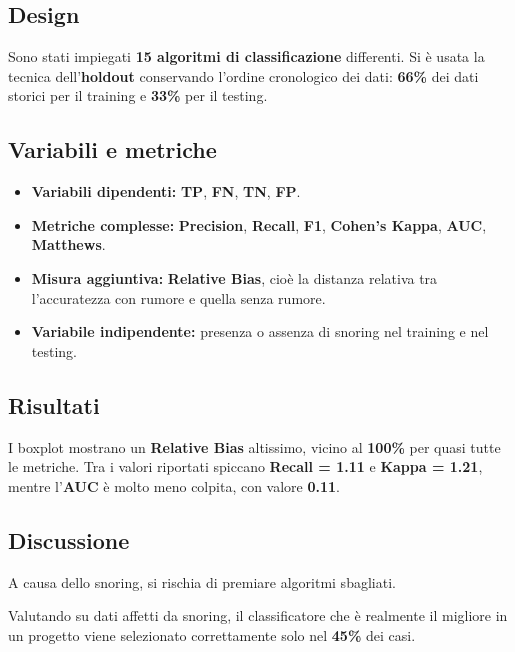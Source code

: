 \subsection{Design}

Sono stati impiegati \textbf{15 algoritmi di classificazione} differenti. Si è usata la tecnica dell'\textbf{holdout} conservando l'ordine cronologico dei dati: \textbf{66\%} dei dati storici per il training e \textbf{33\%} per il testing.

\subsection{Variabili e metriche}

\begin{itemize}
    \item \textbf{Variabili dipendenti:} \textbf{TP}, \textbf{FN}, \textbf{TN}, \textbf{FP}.
    \item \textbf{Metriche complesse:} \textbf{Precision}, \textbf{Recall}, \textbf{F1}, \textbf{Cohen's Kappa}, \textbf{AUC}, \textbf{Matthews}.
    \item \textbf{Misura aggiuntiva:} \textbf{Relative Bias}, cioè la distanza relativa tra l'accuratezza con rumore e quella senza rumore.
    \item \textbf{Variabile indipendente:} presenza o assenza di snoring nel training e nel testing.
\end{itemize}

\subsection{Risultati}

I boxplot mostrano un \textbf{Relative Bias} altissimo, vicino al \textbf{100\%} per quasi tutte le metriche. Tra i valori riportati spiccano \textbf{Recall = 1.11} e \textbf{Kappa = 1.21}, mentre l'\textbf{AUC} è molto meno colpita, con valore \textbf{0.11}.

\subsection{Discussione}

A causa dello snoring, si rischia di premiare algoritmi sbagliati.

\begin{notaslide}
Valutando su dati affetti da snoring, il classificatore che è realmente il migliore in un progetto viene selezionato correttamente solo nel \textbf{45\%} dei casi.
\end{notaslide}

